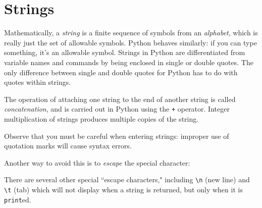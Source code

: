 \documentclass[m3380-lec-main.tex]{subfiles}
\begin{document}
\section{Strings}
Mathematically, a \emph{string} is a finite sequence of symbols from an \emph{alphabet}, which is really just the set of allowable symbols. Python behaves similarly: if you can type something, it's an allowable symbol. Strings in Python are differentiated from variable names and commands by being enclosed in single or double quotes. The only difference between single and double quotes for Python has to do with quotes within strings.

The operation of attaching one string to the end of another string is called \emph{concatenation}, and is carried out in Python using the \verb|+| operator. Integer multiplication of strings produces multiple copies of the string.

\smallskip\noindent
Observe that you must be careful when entering strings: improper use of quotation marks will cause syntax errors.

\smallskip\noindent
Another way to avoid this is to \emph{escape} the special character:

\smallskip\noindent
There are several other special ``escape characters," including \verb|\n| (new line) and \verb|\t| (tab) which will not display when a string is returned, but only when it is \verb|print|ed.
\end{document}
